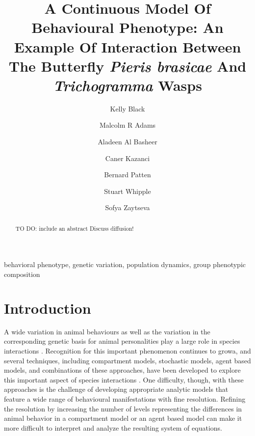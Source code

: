 \documentclass[review,authoryear]{elsarticle}
\begin{document}
\begin{frontmatter}

\title{A Continuous Model Of Behavioural Phenotype: An Example Of
  Interaction Between The Butterfly \textit{Pieris brasicae} And
  \textit{Trichogramma} Wasps}

\author[math]{Kelly Black}\author[math]{Malcolm R Adams}\author[math]{Aladeen Al Basheer}\author[math,engineering]{Caner Kazanci}\author[odum]{Bernard Patten}\author[odum]{Stuart Whipple}\author[math]{Sofya Zaytseva}

\address[math]{Department of Mathematics, University of Georgia, Athens, GA 30602, USA}
\address[engineering]{College of Engineering, University of Georgia, Athens, GA 30602, USA}
\address[odum]{Odum School of Ecology and College of Engineering, University of Georgia, Athens, GA 30602, USA}



\begin{abstract}
TO DO: include an abstract
Discuss diffusion!
\end{abstract}

\begin{keyword}
behavioral phenotype, genetic variation, population dynamics, group phenotypic composition
\end{keyword}

\end{frontmatter}

\linenumbers


\section{Introduction}

A wide variation in animal behaviours as well as the variation in the corresponding genetic basis for animal personalities play a large role in species interactions \citep{doi:10.1111/j.1461-0248.2010.01536.x,doi:10.1086/687235,mierzejewski_horn_luong_2019,SANTICCHIA20191,doi:10.1098/rspb.2014.1016,FARINE2015609,sibbald2009individual,kurvers2011effect,modlmeier2012diverse,doi:10.1037/0735-7036.107.3.250}.   Recognition for this important phenomenon continues to growa, and several techniques, including compartment models, stochastic
models, agent based models, and combinations of these
approaches, have been developed to explore this important aspect of species interactions  \citep{Keeling65,doi:10.1086/687235,doi:10.1098/rspb.2001.1599,SuperspreadingLloyd}.  One difficulty, though, with these approaches is the challenge of developing appropriate analytic models that feature a wide range of behavioural manifestations with fine resolution. Refining the resolution by increasing the number of levels representing the differences in animal behavior in a compartment model or an agent based model can make it more difficult to interpret and analyze the resulting system of equations. 
\end{document}
